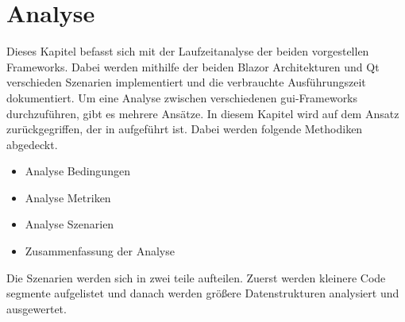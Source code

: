 \chapter{Analyse}
\label{chp:analyse}
Dieses Kapitel befasst sich mit der Laufzeitanalyse der beiden vorgestellen Frameworks. Dabei
werden mithilfe der beiden Blazor Architekturen und Qt verschieden Szenarien implementiert und
die verbrauchte Ausführungszeit dokumentiert.
\newline
\newline
Um eine Analyse zwischen verschiedenen \ac{gui}-Frameworks durchzuführen, gibt es mehrere Ansätze.
In diesem Kapitel wird auf dem Ansatz zurückgegriffen, der in \cite{JavaVsCSharp} aufgeführt ist. Dabei werden
folgende Methodiken abgedeckt.

\begin{itemize}
    \item Analyse Bedingungen
    \item Analyse Metriken
    \item Analyse Szenarien
    \item Zusammenfassung der Analyse
\end{itemize}

Die Szenarien werden sich in zwei teile aufteilen. Zuerst werden kleinere Code segmente
aufgelistet und danach werden größere Datenstrukturen analysiert und ausgewertet.




